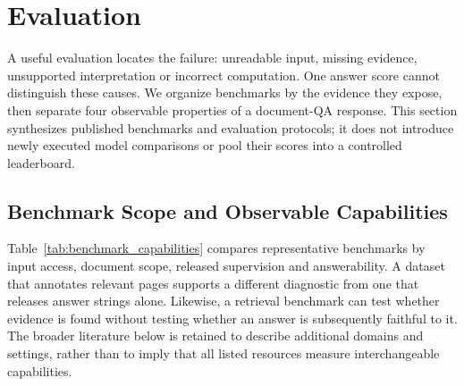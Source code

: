 \section{Evaluation}
\label{sec:eval}

A useful evaluation locates the failure: unreadable input, missing evidence, unsupported interpretation or incorrect computation. One answer score cannot distinguish these causes. We organize benchmarks by the evidence they expose, then separate four observable properties of a document-QA response. This section synthesizes published benchmarks and evaluation protocols; it does not introduce newly executed model comparisons or pool their scores into a controlled leaderboard.

\subsection{Benchmark Scope and Observable Capabilities}

Table~\ref{tab:benchmark_capabilities} compares representative benchmarks by input access, document scope, released supervision and answerability. A dataset that annotates relevant pages supports a different diagnostic from one that releases answer strings alone. Likewise, a retrieval benchmark can test whether evidence is found without testing whether an answer is subsequently faithful to it. The broader literature below is retained to describe additional domains and settings, rather than to imply that all listed resources measure interchangeable capabilities.

